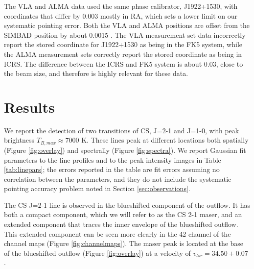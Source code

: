 \documentclass[twocolumn]{aastex62}
\begin{document}
The VLA and ALMA data used the same phase calibrator, J1922+1530, with coordinates
that differ by 0.003 \arcsec mostly in RA, which sets a lower limit on our systematic
pointing error.  Both the VLA and ALMA positions are offset from the SIMBAD
position by about 0.0015 \arcsec.  The VLA measurement set data incorrectly
report the stored coordinate for J1922+1530 as being in the FK5 system, while
the ALMA measurement sets correctly report the stored coordinate as being in ICRS.
The difference between the ICRS and FK5 system is about 0.03\arcsec, close to the
beam size, and therefore is highly relevant for these data.


\section{Results}
We report the detection of two transitions of CS, J=2-1 and J=1-0, with
peak brightness $T_{B,max}\approx7000$ K.
These lines peak at different locations both spatially (Figure
\ref{fig:overlay}) and spectrally (Figure \ref{fig:spectra}).
We report Gaussian fit parameters to the line profiles and to the peak intensity
images in Table \ref{tab:linepars}; the errors reported in the table are fit
errors assuming no correlation between the parameters, and they do not include
the systematic pointing accuracy problem noted in Section \ref{sec:observations}.

The CS J=2-1 line is observed in the blueshifted component of the outflow.
It has both a compact component, which we will refer to as the CS 2-1 maser,
and an extended component that traces the inner envelope of the blueshifted
outflow.  This extended component can be seen more clearly in the 42 \kms
channel of the channel maps (Figure \ref{fig:channelmaps}).  The maser
peak is located at the base of the blueshifted outflow (Figure
\ref{fig:overlay}) at a velocity of $v_{lsr}=34.50\pm0.07$ \kms.
\end{document}
